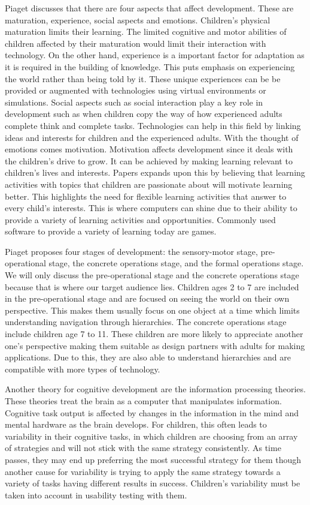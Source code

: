 Piaget discusses that there are four aspects that affect development. These are maturation, experience, social aspects and emotions. Children's physical maturation limits their learning. The limited cognitive and motor abilities of children affected by their maturation would limit their interaction with technology. On the other hand, experience is a important factor for adaptation as it is required in the building of knowledge. This puts emphasis on experiencing the world rather than being told by it. These unique experiences can be be provided or augmented with technologies using virtual environments or simulations. Social aspects such as social interaction play a key role in development such as when children copy the way of how experienced adults complete think and complete tasks. Technologies can help in this field by linking ideas and interests for children and the experienced adults. With the thought of emotions comes motivation. Motivation affects development since it deals with the children's drive to grow. It can be achieved by making learning relevant to children's lives and interests. Papers expands upon this by believing that learning activities with topics that children are passionate about will motivate learning better. This highlights the need for flexible learning activities that answer to every child's interests. This is where computers can shine due to their ability to provide a variety of learning activities and opportunities. Commonly used software to provide a variety of learning today are games.

Piaget proposes four stages of development: the sensory-motor stage, pre-operational stage, the concrete operations stage, and the formal operations stage. We will only discuss the pre-operational stage and the concrete operations stage because that is where our target audience lies. Children ages 2 to 7 are included in the pre-operational stage and are focused on seeing the world on their own perspective. This makes them usually focus on one object at a time which limits understanding navigation through hierarchies. The concrete operations stage include children age 7 to 11. These children are more likely to appreciate another one's perspective making them suitable as design partners with adults for making applications. Due to this, they are also able to understand hierarchies and are compatible with more types of technology.

Another theory for cognitive development are the information processing theories. These theories treat the brain as a computer that manipulates information. Cognitive task output is affected by changes in the information in the mind and mental hardware as the brain develops. For children, this often leads to variability in their cognitive tasks, in which children are choosing from an array of strategies and will not stick with the same strategy consistently. As time passes, they may end up preferring the most successful strategy for them though another cause for variability is trying to apply the same strategy towards a variety of tasks having different results in success. Children's variability must be taken into account in usability testing with them.


